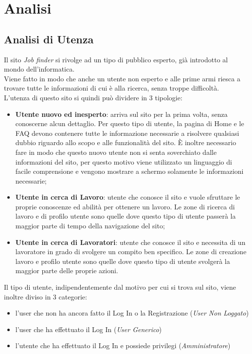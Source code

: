 \section{Analisi}
	
  \subsection{Analisi di Utenza}	
	  Il sito \textit{Job finder} si rivolge ad un tipo di pubblico esperto, già introdotto al mondo dell’informatica. \\
    Viene fatto in modo che anche un utente non esperto e alle prime armi riesca a trovare tutte le informazioni di cui è alla ricerca, senza troppe difficoltà.\\	
    L’utenza di questo sito si quindi può dividere in 3 tipologie:
	  \begin{itemize}
      \item \textbf{Utente nuovo ed inesperto}: arriva sul sito per la prima volta, senza conoscerne alcun dettaglio. Per questo tipo di utente, la pagina di Home e le FAQ devono contenere tutte 
      le informazione necessarie a risolvere qualsiasi dubbio riguardo allo scopo e alle funzionalità del sito. È inoltre necessario fare in modo che questo nuovo utente non si
      senta soverchiato dalle informazioni del sito, per questo motivo viene utilizzato un linguaggio di facile comprensione e vengono mostrare a schermo solamente le 
      informazioni necessarie;
      \item \textbf{Utente in cerca di Lavoro}: utente che conosce il sito e vuole sfruttare le proprie conoscenze ed abilità per ottenere un lavoro. Le zone di ricerca di lavoro e di profilo utente 
      sono quelle dove questo tipo di utente passerà la maggior parte di tempo della navigazione del sito;
      \item \textbf{Utente in cerca di Lavoratori}: utente che conosce il sito e necessita di un lavoratore in grado di svolgere un compito ben specifico. Le zone di creazione lavoro 
      e profilo utente sono quelle dove questo tipo di utente svolgerà la maggior parte delle proprie azioni.
    \end{itemize}
    Il tipo di utente, indipendentemente dal motivo per cui si trova sul sito, viene inoltre diviso in 3 categorie:
    \begin{itemize} 
      \item l’user che non ha ancora fatto il Log In o la Registrazione (\textit{User Non Loggato})
      \item l’user che ha effettuato il Log In (\textit{User Generico}) 
      \item l’utente che ha effettuato il Log In e possiede privilegi (\textit{Amministratore})
    \end{itemize}

